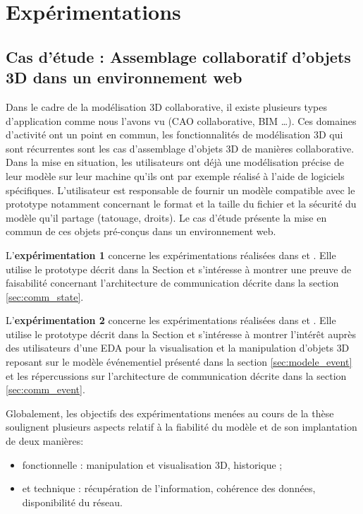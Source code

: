 \chapter{Expérimentations}
\chaptertable

\section{Cas d'étude : Assemblage collaboratif d'objets 3D dans un 
environnement web}
\label{sec:use_case}
Dans le cadre de la modélisation \gls{3D} collaborative, il existe plusieurs types 
d'application comme nous l'avons vu (\gls{CAO} collaborative, \gls{BIM} \dots). 
Ces domaines d'activité ont un point en commun, les fonctionnalités de 
modélisation \gls{3D} qui sont récurrentes sont les cas d'assemblage d'objets 
\gls{3D} de 
manières collaborative. Dans la mise en situation, les utilisateurs ont déjà une 
modélisation précise de leur modèle sur leur machine qu'ils ont par exemple 
réalisé à l'aide de logiciels spécifiques. L'utilisateur est responsable de fournir un 
modèle compatible avec le prototype notamment concernant le format et la taille 
du fichier et la sécurité du modèle qu'il partage (tatouage, droits). Le cas d'étude 
présente la mise en commun de ces objets pré-conçus dans un environnement 
web.

L'\textbf{expérimentation 1} concerne les expérimentations réalisées dans 
\cite{Desprat2015a} 
et \cite{Desprat2015b}. Elle utilise le prototype décrit dans la Section  et s'intéresse à montrer une preuve de faisabilité concernant l'architecture 
de communication décrite dans la section \ref{sec:comm_state}. 

 
L'\textbf{expérimentation 2} concerne les expérimentations réalisées dans 
\cite{Desprat2016} et 
\cite{Desprat2017}. Elle utilise le prototype décrit dans la Section  
et s'intéresse à montrer l'intérêt auprès des utilisateurs d'une \gls{EDA} pour la 
visualisation et la manipulation d'objets \gls{3D} reposant sur le modèle 
événementiel présenté dans la section \ref{sec:modele_event} et les 
répercussions sur l'architecture de 
communication décrite dans la section \ref{sec:comm_event}.

Globalement, les objectifs des expérimentations menées au cours de la thèse 
soulignent plusieurs aspects relatif à la fiabilité 
du modèle et de son implantation de deux manières: 
\begin{itemize}
	\item fonctionnelle : manipulation et visualisation 
	3D, historique ;
	\item et technique : récupération de l'information, cohérence des 
	données, disponibilité du réseau.
\end{itemize}

